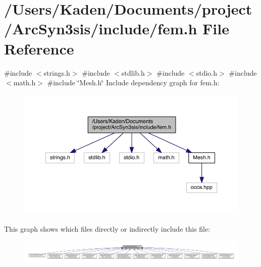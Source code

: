 \hypertarget{a00554}{}\section{/\+Users/\+Kaden/\+Documents/project/\+Arc\+Syn3sis/include/fem.h File Reference}
\label{a00554}
{\ttfamily \#include $<$strings.\+h$>$}\newline
{\ttfamily \#include $<$stdlib.\+h$>$}\newline
{\ttfamily \#include $<$stdio.\+h$>$}\newline
{\ttfamily \#include $<$math.\+h$>$}\newline
{\ttfamily \#include \char`\"{}Mesh.\+h\char`\"{}}\newline
Include dependency graph for fem.\+h\+:\nopagebreak
\begin{figure}[H]
\begin{center}
\leavevmode
\includegraphics[width=350pt]{a00555}
\end{center}
\end{figure}
This graph shows which files directly or indirectly include this file\+:\nopagebreak
\begin{figure}[H]
\begin{center}
\leavevmode
\includegraphics[width=350pt]{a00556}
\end{center}
\end{figure}
